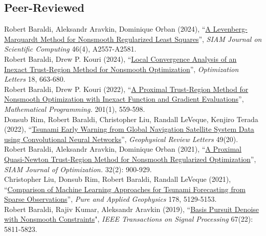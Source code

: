 \documentclass[12pt, a4paper]{article}
\newcommand{\years}[1]{\marginnote{#1}}
\begin{document}
\subsection*{Peer-Reviewed}
\years{2024} Robert Baraldi, Aleksandr Aravkin, Dominique Orban (2024), ``\href{https://doi.org/10.1137/22M1538971}{A Levenberg-Marquardt Method for Nonsmooth Regularized Least Squares}'',  \emph{SIAM Journal on Scientific Computing} 46(4), A2557-A2581.\\
\years{2024} Robert Baraldi, Drew P. Kouri (2024), ``\href{https://link.springer.com/article/10.1007/s11590-023-02092-8}{Local Convergence Analysis of an Inexact Trust-Region Method for Nonsmooth Optimization}'', \emph{Optimization Letters} 18, 663-680.\\
\years{2022} Robert Baraldi, Drew P. Kouri (2022), ``\href{https://link.springer.com/article/10.1007/s10107-022-01915-3}{A Proximal Trust-Region Method for Nonsmooth Optimization with Inexact Function and Gradient Evaluations}'', \emph{Mathematical Programming.} 201(1), 559-598.\\
\years{2022} Donsub Rim, Robert Baraldi, Christopher Liu, Randall LeVeque, Kenjiro Terada (2022), ``\href{https://agupubs.onlinelibrary.wiley.com/doi/full/10.1029/2022GL099511}{Tsunami Early Warning from Global Navigation Satellite System Data using Convolutional Neural Networks}'', \emph{Geophysical Review Letters} 49(20).\\
\noindent
\years{2021} Robert Baraldi, Aleksandr Aravkin, Dominique Orban (2021), ``\href{https://epubs.siam.org/doi/abs/10.1137/21M1409536}{A Proximal Quasi-Newton Trust-Region Method for Nonsmooth Regularized Optimization}'', \emph{SIAM Journal of Optimization.} 32(2): 900-929.\\
\years{2021} Christopher Liu, Donsub Rim, Robert Baraldi, Randall LeVeque (2021), ``\href{https://link.springer.com/article/10.1007/s00024-021-02841-9}{Comparison of Machine Learning Approaches for Tsunami Forecasting from Sparse Observations}'', \emph{Pure and Applied Geophysics} 178, 5129-5153. \\
\noindent
\years{2019} Robert Baraldi, Rajiv Kumar, Aleksandr Aravkin  (2019), “\href{https://ieeexplore.ieee.org/document/8861392}{Basis Pursuit Denoise with Nonsmooth Constraints}", \emph{IEEE Transactions on Signal Processing} 67(22): 5811-5823.\\
\end{document}
